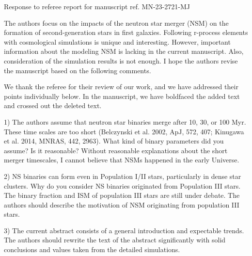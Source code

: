 \documentclass[11pt]{article}
\begin{document}
\begin{center} 
\bfseries{
\begin{large}
  Response to referee report for manuscript ref. MN-23-2721-MJ
\end{large}
}
\end{center}

\begin{tcolorbox}[colback={lightgray}]
    The authors focus on the impacts of the neutron star merger (NSM) on the formation of second-generation stars in first galaxies. Following r-process elements with cosmological simulations is unique and interesting. However, important information about the modeling NSM is lacking in the current manuscript. Also, consideration of the simulation results is not enough. I hope the authors revise the manuscript based on the following comments.
\end{tcolorbox}

We thank the referee for their review of our work, and we have
addressed their points individually below.  In the manuscript, we have
boldfaced the added text and crossed out the deleted text.  

\begin{tcolorbox}[colback={lightgray}]
    1)      The authors assume that neutron star binaries merge after 10, 30, or 100 Myr. These time scales are too short (Belczynski et al. 2002, ApJ, 572, 407; Kinugawa et al. 2014, MNRAS, 442, 2963). What kind of binary parameters did you assume? Is it reasonable? Without reasonable explanations about the short merger timescales, I cannot believe that NSMs happened in the early Universe.
\end{tcolorbox}



\begin{tcolorbox}[colback={lightgray}]
    2)      NS binaries can form even in Population I/II stars, particularly in dense star clusters. Why do you consider NS binaries originated from Population III stars. The binary fraction and ISM of population III stars are still under debate. The authors should describe the motivation of NSM originating from population III stars.
\end{tcolorbox}

\begin{tcolorbox}[colback={lightgray}]
    3)      The current abstract consists of a general introduction and expectable trends. The authors should rewrite the text of the abstract significantly with solid conclusions and values taken from the detailed simulations.
\end{tcolorbox}
\end{document}
